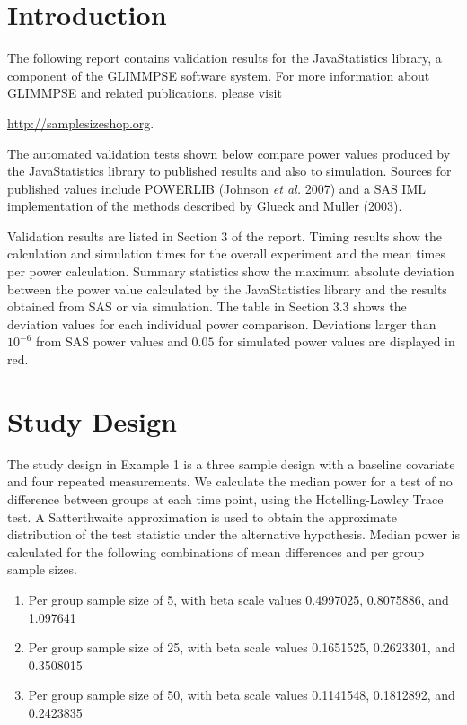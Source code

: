 \documentclass{glimmpse-report}
\begin{document}
\section{Introduction}
The following report contains validation results for the JavaStatistics library, a component of the GLIMMPSE software system.  For more information about GLIMMPSE and related publications, please visit

 

\href{http://samplesizeshop.org}{http://samplesizeshop.org}.

The automated validation tests shown below compare power values produced by the JavaStatistics library to published results and also to simulation.  Sources for published values include POWERLIB (Johnson \emph{et al.} 2007) and a SAS IML implementation of the methods described by Glueck and Muller (2003).

Validation results are listed in Section 3 of the report.  Timing results show the calculation and simulation times for the overall experiment and the mean times per power calculation.  Summary statistics show the maximum absolute deviation between the power value calculated by the JavaStatistics library and the results obtained from SAS or via simulation.  The table in Section 3.3 shows the deviation values for each individual power comparison.  Deviations larger than $10^{-6}$ from SAS power values and $0.05$ for simulated power values are displayed in red.

 \section{Study Design}
The study design in Example 1 is a three sample design with a baseline covariate and four repeated measurements.  We calculate the median power for a test of no difference between groups at each time point, using the Hotelling-Lawley Trace test.  A Satterthwaite approximation is used to obtain the approximate distribution of the test statistic under the alternative hypothesis.  Median power is calculated for the following combinations of mean differences and per group sample sizes.

\begin{enumerate}\item Per group sample size of 5, with beta scale values 0.4997025, 0.8075886, and 1.097641\item Per group sample size of 25, with beta scale values 0.1651525, 0.2623301, and 0.3508015\item Per group sample size of 50, with beta scale values 0.1141548,  0.1812892, and  0.2423835
\end{enumerate}
\end{document}
